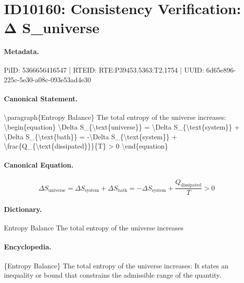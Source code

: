 \section*{ID10160: Consistency Verification: Δ S\_universe}
\paragraph{Metadata.}
PiID: 5366656416547 | RTEID: RTE:P39453.5363:T2.1754 | UUID: 6d65e896-225c-5e30-a08c-093e53ad4e30

\paragraph{Canonical Statement.}
\textbackslash{}paragraph\{Entropy Balance\} The total entropy of the universe increases: \textbackslash{}begin\{equation\} \textbackslash{}Delta S\_\{\textbackslash{}text\{universe\}\} = \textbackslash{}Delta S\_\{\textbackslash{}text\{system\}\} + \textbackslash{}Delta S\_\{\textbackslash{}text\{bath\}\} = -\textbackslash{}Delta S\_\{\textbackslash{}text\{system\}\} + \textbackslash{}frac\{Q\_\{\textbackslash{}text\{dissipated\}\}\}\{T\} > 0 \textbackslash{}end\{equation\}

\paragraph{Canonical Equation.}
\[
\Delta S_{\text{universe}} = \Delta S_{\text{system}} + \Delta S_{\text{bath}} = -\Delta S_{\text{system}} + \frac{Q_{\text{dissipated}}}{T} > 0
\]

\paragraph{Dictionary.}
Entropy Balance The total entropy of the universe increases

\paragraph{Encyclopedia.}
\{Entropy Balance\} The total entropy of the universe increases: It states an inequality or bound that constrains the admissible range of the quantity.
